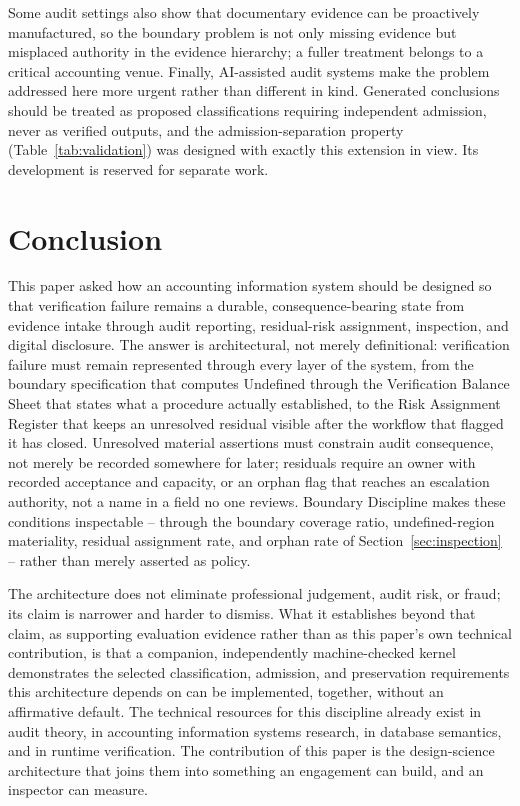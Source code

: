 \documentclass[11pt,a4paper]{article}
\theoremstyle{definition}
\theoremstyle{remark}
\begin{document}
Some audit settings also show that documentary evidence can be proactively manufactured, so the boundary problem is not only missing evidence but misplaced authority in the evidence hierarchy; a fuller treatment belongs to a critical accounting venue. Finally, AI-assisted audit systems make the problem addressed here more urgent rather than different in kind. Generated conclusions should be treated as proposed classifications requiring independent admission, never as verified outputs, and the admission-separation property (Table~\ref{tab:validation}) was designed with exactly this extension in view. Its development is reserved for separate work.

\section{Conclusion}
\label{sec:conclusion}

This paper asked how an accounting information system should be designed so that verification failure remains a durable, consequence-bearing state from evidence intake through audit reporting, residual-risk assignment, inspection, and digital disclosure. The answer is architectural, not merely definitional: verification failure must remain represented through every layer of the system, from the boundary specification that computes \textsf{Undefined} through the Verification Balance Sheet that states what a procedure actually established, to the Risk Assignment Register that keeps an unresolved residual visible after the workflow that flagged it has closed. Unresolved material assertions must constrain audit consequence, not merely be recorded somewhere for later; residuals require an owner with recorded acceptance and capacity, or an orphan flag that reaches an escalation authority, not a name in a field no one reviews. Boundary Discipline makes these conditions inspectable -- through the boundary coverage ratio, undefined-region materiality, residual assignment rate, and orphan rate of Section~\ref{sec:inspection} -- rather than merely asserted as policy.

The architecture does not eliminate professional judgement, audit risk, or fraud; its claim is narrower and harder to dismiss. What it establishes beyond that claim, as supporting evaluation evidence rather than as this paper's own technical contribution, is that a companion, independently machine-checked kernel demonstrates the selected classification, admission, and preservation requirements this architecture depends on can be implemented, together, without an affirmative default. The technical resources for this discipline already exist in audit theory, in accounting information systems research, in database semantics, and in runtime verification. The contribution of this paper is the design-science architecture that joins them into something an engagement can build, and an inspector can measure.
\end{document}

